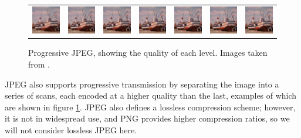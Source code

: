 \begin{figure}
\begin{center}
\begin{tabular}{ccccccc}
\includegraphics[width=1.5cm]{../images/jpeg_1} &
\includegraphics[width=1.5cm]{../images/jpeg_2} &
\includegraphics[width=1.5cm]{../images/jpeg_3} &
\includegraphics[width=1.5cm]{../images/jpeg_4} &
\includegraphics[width=1.5cm]{../images/jpeg_5} &
\includegraphics[width=1.5cm]{../images/jpeg_6} &
\includegraphics[width=1.5cm]{../images/jpeg_7}
\end{tabular}
\caption[Progressive JPEG]{\label{fig:progjpeg} Progressive JPEG, showing the quality of each level. Images taken from \cite{Rauschenbach}.}
\end{center}
\end{figure}

JPEG also supports progressive transmission by separating the image into a series of scans, each encoded at a higher quality than the last, examples of which are shown in figure \ref{fig:progjpeg}. JPEG also defines a lossless compression scheme; however, it is not in widespread use, and PNG provides higher compression ratios, so we will not consider lossless JPEG here.

